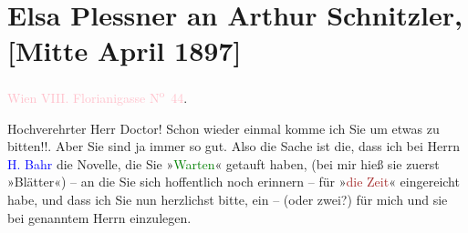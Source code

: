 

\renewcommand{\erwaehntePersonen}{Personen: Hermann Bahr, Elsa Plessner}
\renewcommand{\erwaehnteInstitutionen}{Institutionen: Die Zeit. Wiener Wochenschrift}
\renewcommand{\erwaehnteOrte}{Orte: Florianigasse 44, Paris, Wien}
\renewcommand{\erwaehnteWerke}{Werke: Warten}
\section[Elsa Plessner an Arthur Schnitzler, {[}Mitte April 1897{]}]{Elsa Plessner an Arthur Schnitzler, {[}Mitte April 1897{]}}
\nopagebreak{}
\rehead{ }\normalsize\beginnumbering{}
\toendnotes[C]{\smallbreak\pagebreak[2]}
\toendnotes[C]{\smallbreak}
\pstart
           \raggedleft{}{\pb}\textcolor{pink}{Wien VIII. Florianigasse N\textsuperscript{o} 44}{}\ledrightnote{\textcolor{pink}{Florianigasse 44}}.\pend
           
\pstart{}Hochverehrter Herr Doctor!\pend\vspace{0.5em}
\pstart
           Schon wieder einmal komme ich Sie um etwas zu bitten!!. Aber Sie sind ja immer so
               gut. Also die Sache ist die, dass ich bei Herrn \textcolor{blue}{H.
                  Bahr}{}\ledrightnote{\textcolor{blue}{Hermann Bahr}} die Novelle, die Sie »\textcolor{green}{Warten}{}\ledrightnote{\textcolor{green}{Warten}}«
               getauft haben, (bei mir hieß sie zuerst »Blätter«) – an die Sie sich hoffentlich noch
               erinnern – für »\textcolor{brown}{die Zeit}{}\ledrightnote{\textcolor{brown}{Die Zeit. Wiener Wochenschrift}}« eingereicht habe, und
               dass ich Sie nun herzlichst bitte, ein – (oder zwei?) \label{K_L03694-11v}\label{} für mich und
               sie bei genanntem Herrn einzulegen.\pend
           
